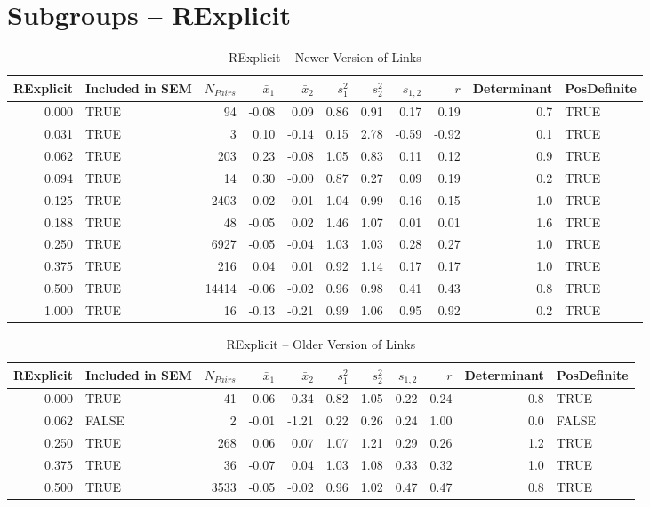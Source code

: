 \documentclass{article}\usepackage[]{graphicx}\usepackage[]{color}
\begin{document}
\section{Subgroups --  RExplicit }%
\begin{table}[ht]
\centering
\begin{tabular}{rlrrrrrrrrl}
  \hline
RExplicit & Included in SEM & $N_{Pairs}$ & $\bar{x}_1$ & $\bar{x}_2$ & $s_1^2$ & $s_2^2$ & $s_{1,2}$ & $r$ & Determinant & PosDefinite \\ 
  \hline
0.000 & TRUE & 94 & -0.08 & 0.09 & 0.86 & 0.91 & 0.17 & 0.19 & 0.7 & TRUE \\ 
  0.031 & TRUE & 3 & 0.10 & -0.14 & 0.15 & 2.78 & -0.59 & -0.92 & 0.1 & TRUE \\ 
  0.062 & TRUE & 203 & 0.23 & -0.08 & 1.05 & 0.83 & 0.11 & 0.12 & 0.9 & TRUE \\ 
  0.094 & TRUE & 14 & 0.30 & -0.00 & 0.87 & 0.27 & 0.09 & 0.19 & 0.2 & TRUE \\ 
  0.125 & TRUE & 2403 & -0.02 & 0.01 & 1.04 & 0.99 & 0.16 & 0.15 & 1.0 & TRUE \\ 
  0.188 & TRUE & 48 & -0.05 & 0.02 & 1.46 & 1.07 & 0.01 & 0.01 & 1.6 & TRUE \\ 
  0.250 & TRUE & 6927 & -0.05 & -0.04 & 1.03 & 1.03 & 0.28 & 0.27 & 1.0 & TRUE \\ 
  0.375 & TRUE & 216 & 0.04 & 0.01 & 0.92 & 1.14 & 0.17 & 0.17 & 1.0 & TRUE \\ 
  0.500 & TRUE & 14414 & -0.06 & -0.02 & 0.96 & 0.98 & 0.41 & 0.43 & 0.8 & TRUE \\ 
  1.000 & TRUE & 16 & -0.13 & -0.21 & 0.99 & 1.06 & 0.95 & 0.92 & 0.2 & TRUE \\ 
   \hline
\end{tabular}
\caption{RExplicit -- Newer Version of Links} 
\end{table}
\begin{table}[ht]
\centering
\begin{tabular}{rlrrrrrrrrl}
  \hline
RExplicit & Included in SEM & $N_{Pairs}$ & $\bar{x}_1$ & $\bar{x}_2$ & $s_1^2$ & $s_2^2$ & $s_{1,2}$ & $r$ & Determinant & PosDefinite \\ 
  \hline
0.000 & TRUE & 41 & -0.06 & 0.34 & 0.82 & 1.05 & 0.22 & 0.24 & 0.8 & TRUE \\ 
  0.062 & FALSE & 2 & -0.01 & -1.21 & 0.22 & 0.26 & 0.24 & 1.00 & 0.0 & FALSE \\ 
  0.250 & TRUE & 268 & 0.06 & 0.07 & 1.07 & 1.21 & 0.29 & 0.26 & 1.2 & TRUE \\ 
  0.375 & TRUE & 36 & -0.07 & 0.04 & 1.03 & 1.08 & 0.33 & 0.32 & 1.0 & TRUE \\ 
  0.500 & TRUE & 3533 & -0.05 & -0.02 & 0.96 & 1.02 & 0.47 & 0.47 & 0.8 & TRUE \\ 
   \hline
\end{tabular}
\caption{RExplicit -- Older Version of Links} 
\end{table}
\newpage 
\end{document}
